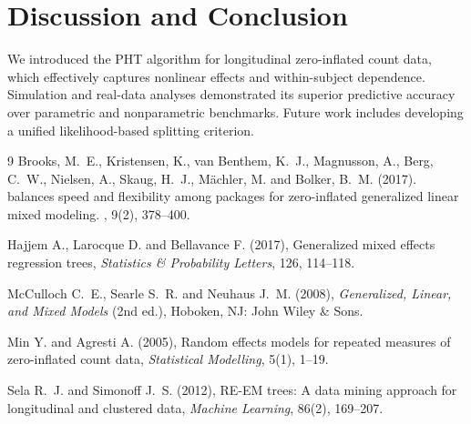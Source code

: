 \documentclass[twoside]{article}
\begin{document}
\section*{Discussion and Conclusion}   
We introduced the PHT algorithm for longitudinal zero-inflated count data, which effectively captures nonlinear effects and within-subject dependence. Simulation and real-data analyses demonstrated its superior predictive accuracy over parametric and nonparametric benchmarks. Future work includes developing a unified likelihood-based splitting criterion.
\begin{thebibliography}{9}
Brooks, M.~E., Kristensen, K., van Benthem, K.~J., Magnusson, A., Berg, C.~W.,
Nielsen, A., Skaug, H.~J., M\"{a}chler, M. and Bolker, B.~M. (2017).
 balances speed and flexibility among packages for
zero-inflated generalized linear mixed modeling.
, 9(2), 378--400.

Hajjem A., Larocque D. and Bellavance F. (2017),
Generalized mixed effects regression trees,
{\it Statistics \& Probability Letters}, 126, 114--118.

McCulloch C.~E., Searle S.~R. and Neuhaus J.~M. (2008),
{\it Generalized, Linear, and Mixed Models} (2nd ed.),
Hoboken, NJ: John Wiley \& Sons.

Min Y. and Agresti A. (2005),
Random effects models for repeated measures of zero-inflated count data,
{\it Statistical Modelling}, 5(1), 1--19.

Sela R.~J. and Simonoff J.~S. (2012), 
RE-EM trees: A data mining approach for longitudinal and clustered data, 
{\it Machine Learning}, 86(2), 169--207.


\end{thebibliography}
 
\end{document}
